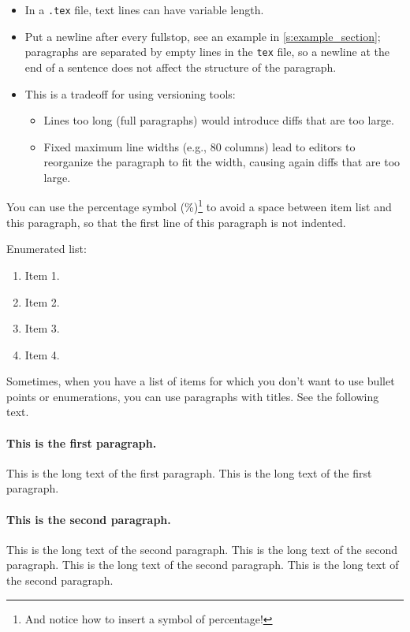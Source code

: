 \begin{itemize}
\item In a \texttt{.tex} file, text lines can have variable length.
\item Put a newline after every fullstop, see an example in \cref{s:example_section}; paragraphs are separated by empty lines in the \texttt{tex} file, so a newline at the end of a sentence does not affect the structure of the paragraph.
\item This is a tradeoff for using versioning tools:
\begin{itemize}
\item Lines too long (full paragraphs) would introduce diffs that are too large.
\item Fixed maximum line widths (e.g., $80$ columns) lead to editors to reorganize the paragraph to fit the width, causing again diffs that are too large.
\end{itemize}
\end{itemize}
%
You can use the percentage symbol (\%)\footnote{And notice how to insert a symbol of percentage!} to avoid a space between item list and this paragraph, so that the first line of this paragraph is not indented.

Enumerated list:

\begin{enumerate}
\item Item 1.
\item Item 2.
\item Item 3.
\item Item 4.
\end{enumerate}

Sometimes, when you have a list of items for which you don't want to use bullet points or enumerations, you can use paragraphs with titles.
See the following text.

\paragraph{This is the first paragraph.}
This is the long text of the first paragraph.
This is the long text of the first paragraph.

\paragraph{This is the second paragraph.}
This is the long text of the second paragraph.
This is the long text of the second paragraph.
This is the long text of the second paragraph.
This is the long text of the second paragraph.

